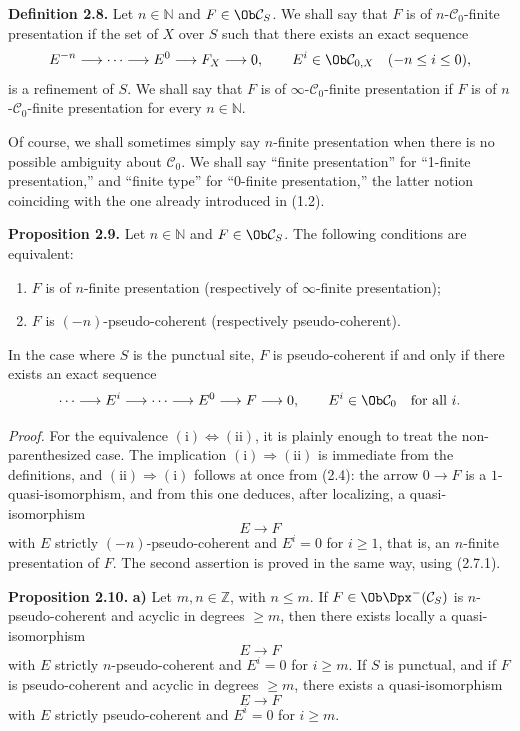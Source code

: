 \textbf{Definition 2.8.} Let \(n\in\mathbb N\) and \(F\in\Ob\mathcal C_S\). We shall say that \(F\) is of \(n\)-\(\mathcal C_0\)-finite presentation if the set of \(X\) over \(S\) such that there exists an exact sequence
\[
  E^{-n}\longrightarrow\cdots\longrightarrow E^0\longrightarrow F_X\longrightarrow 0,
\qquad E^i\in\Ob\mathcal C_{0,X}\quad(-n\leq i\leq 0),
\]
is a refinement of \(S\). We shall say that \(F\) is of \(\infty\)-\(\mathcal C_0\)-finite presentation if \(F\) is of \(n\)-\(\mathcal C_0\)-finite presentation for every \(n\in\mathbb N\).

Of course, we shall sometimes simply say \(n\)-finite presentation when there is no possible ambiguity about \(\mathcal C_0\). We shall say ``finite presentation'' for ``1-finite presentation,'' and ``finite type'' for ``0-finite presentation,'' the latter notion coinciding with the one already introduced in (1.2).

\textbf{Proposition 2.9.} Let \(n\in\mathbb N\) and \(F\in\Ob\mathcal C_S\). The following conditions are equivalent:
\begin{enumerate}[label=(\roman*)]
\item \(F\) is of \(n\)-finite presentation (respectively of \(\infty\)-finite presentation);
\item \(F\) is \((-n)\)-pseudo-coherent (respectively pseudo-coherent).
\end{enumerate}
In the case where \(S\) is the punctual site, \(F\) is pseudo-coherent if and only if there exists an exact sequence
\[
  \cdots\longrightarrow E^i\longrightarrow\cdots\longrightarrow E^0\longrightarrow F\longrightarrow 0,
\qquad E^i\in\Ob\mathcal C_0\quad\text{for all }i.
\]

\emph{Proof.} For the equivalence \((\mathrm{i})\Leftrightarrow(\mathrm{ii})\), it is plainly enough to treat the non-parenthesized case. The implication \((\mathrm{i})\Rightarrow(\mathrm{ii})\) is immediate from the definitions, and \((\mathrm{ii})\Rightarrow(\mathrm{i})\) follows at once from (2.4): the arrow \(0\to F\) is a \(1\)-quasi-isomorphism, and from this one deduces, after localizing, a quasi-isomorphism
\[
  E\longrightarrow F
\]
with \(E\) strictly \((-n)\)-pseudo-coherent and \(E^i=0\) for \(i\geq 1\), that is, an \(n\)-finite presentation of \(F\). The second assertion is proved in the same way, using (2.7.1).

\textbf{Proposition 2.10.} \textbf{a)} Let \(m,n\in\mathbb Z\), with \(n\leq m\). If \(F\in\Ob\Dpx^-(\mathcal C_S)\) is \(n\)-pseudo-coherent and acyclic in degrees \(\geq m\), then there exists locally a quasi-isomorphism
\[
  E\longrightarrow F
\]
with \(E\) strictly \(n\)-pseudo-coherent and \(E^i=0\) for \(i\geq m\). If \(S\) is punctual, and if \(F\) is pseudo-coherent and acyclic in degrees \(\geq m\), there exists a quasi-isomorphism
\[
  E\longrightarrow F
\]
with \(E\) strictly pseudo-coherent and \(E^i=0\) for \(i\geq m\).

